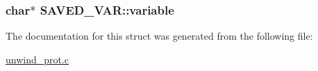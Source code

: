 \subsubsection[{\texorpdfstring{variable}{variable}}]{\setlength{\rightskip}{0pt plus 5cm}char$\ast$ S\+A\+V\+E\+D\+\_\+\+V\+A\+R\+::variable}\hypertarget{structSAVED__VAR_aaa9de1da489d7268a1c427e99535cc89}{}\label{structSAVED__VAR_aaa9de1da489d7268a1c427e99535cc89}


The documentation for this struct was generated from the following file\+:\begin{DoxyCompactItemize}
\item 
\hyperlink{unwind__prot_8c}{unwind\+\_\+prot.\+c}\end{DoxyCompactItemize}
